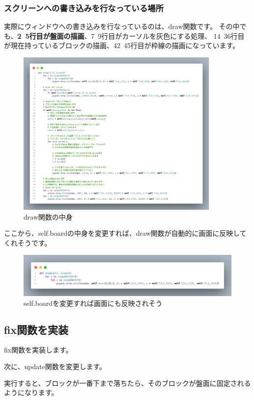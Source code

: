 \subsubsection{スクリーンへの書き込みを行なっている場所}
実際にウィンドウへの書き込みを行なっているのは、draw関数です。
その中でも、\textbf{2~5行目が盤面の描画}、7~9行目がカーソルを灰色にする処理、
14~36行目が現在持っているブロックの描画、42~45行目が枠線の描画になっています。
\begin{figure}
  [h]
  \centering
  \includegraphics[width=100mm]{images/DrawFunction.png}
  \caption{draw関数の中身}
\end{figure}
ここから、self.boardの中身を変更すれば、draw関数が自動的に画面に反映してくれそうです。
\begin{figure}
  [h]
  \centering
  \includegraphics[width=\textwidth]{images/DrawBoard.png}
  \caption{self.boardを変更すれば画面にも反映されそう}
\end{figure}

\subsection{fix関数を実装}
fix関数を実装します。

次に、update関数を変更します。

実行すると、ブロックが一番下まで落ちたら、そのブロックが盤面に固定されるようになります。